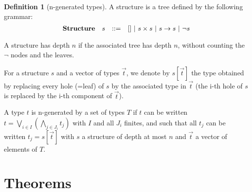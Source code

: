 \documentclass[a4paper]{article}
\theoremstyle{definition}
\newtheorem{definition}{Definition}
\begin{document}

    \begin{definition}[n-generated types]
      A structure is a tree defined by the following grammar:
      \[
        \begin{array}{lrcl}
        \textbf{Structure} & s & ::= & [] ~|~ s\times s ~|~ s\to s ~|~ \neg s\\
        \end{array}
      \]
      
      A structure has depth $n$ if the associated tree has depth $n$, without counting the $\neg$ nodes and the leaves.

      For a structure $s$ and a vector of types $\vec t$, we denote by $s[\vec t]$ the type obtained by replacing every
      hole (=leaf) of $s$ by the associated type in $\vec t$ (the i-th hole of $s$ is replaced by the i-th component of $\vec t$).

      A type $t$ is n-generated by a set of types $T$ if $t$ can be written
      $t=\bigvee_{i\in I}\left(\bigwedge_{j\in J_i}t_j\right)$ with $I$ and all $J_i$ finites,
      and such that all $t_j$ can be written $t_j = s[\vec t]$ with $s$ a structure of depth at most $n$
      and $\vec t$ a vector of elements of $T$.
    \end{definition}

  \section{Theorems}
\end{document}
